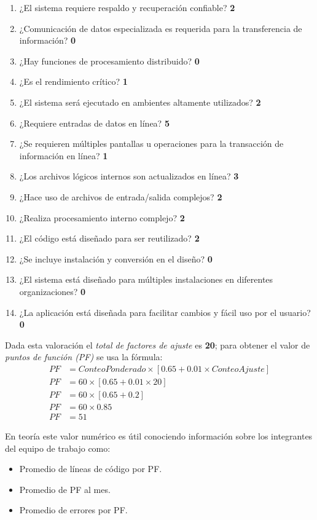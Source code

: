\documentclass[letterpaper]{article}
\begin{document}
\begin{enumerate}
\item ¿El sistema requiere respaldo y recuperación confiable? \textbf{2}
\item ¿Comunicación de datos especializada es requerida para la transferencia de información? \textbf{0}
\item ¿Hay funciones de procesamiento distribuido? \textbf{0}
\item ¿Es el rendimiento crítico? \textbf{1}
\item ¿El sistema será ejecutado en ambientes altamente utilizados? \textbf{2}
\item ¿Requiere entradas de datos en línea? \textbf{5}
\item ¿Se requieren múltiples pantallas u operaciones para la transacción de información en línea? \textbf{1}
\item ¿Los archivos lógicos internos son actualizados en línea? \textbf{3}
\item ¿Hace uso de archivos de entrada/salida complejos? \textbf{2}
\item ¿Realiza procesamiento interno complejo? \textbf{2}
\item ¿El código está diseñado para ser reutilizado? \textbf{2}
\item ¿Se incluye instalación y conversión en el diseño? \textbf{0}
\item ¿El sistema está diseñado para múltiples instalaciones en diferentes organizaciones? \textbf{0}
\item ¿La aplicación está diseñada para facilitar cambios y fácil uso por el usuario? \textbf{0}
\end{enumerate}

Dada esta valoración el \emph{total de factores de ajuste} es \textbf{20}; para obtener el valor de \emph{puntos de función (PF)} se usa la fórmula:
\begin{align*}
  PF &= ConteoPonderado \times [0.65+0.01 \times ConteoAjuste] \\
  PF &= 60 \times [0.65 + 0.01 \times 20] \\
  PF &= 60 \times [0.65 + 0.2] \\
  PF &= 60 \times 0.85 \\
  PF &= 51
\end{align*}

En teoría este valor numérico es útil conociendo información sobre los integrantes del equipo de trabajo como:
\begin{itemize}
\item Promedio de líneas de código por PF.
\item Promedio de PF al mes.
\item Promedio de errores por PF.
\end{itemize}
\end{document}
